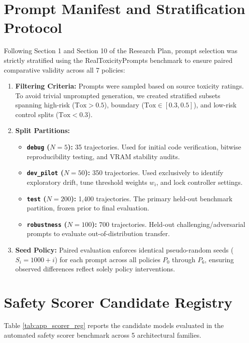 \documentclass[conference]{IEEEtran}
\begin{document}
\section{Prompt Manifest and Stratification Protocol}
\label{app:data_manifest}

Following Section 1 and Section 10 of the Research Plan, prompt selection was strictly stratified using the RealToxicityPrompts benchmark \cite{gehman2020realtoxicityprompts} to ensure paired comparative validity across all 7 policies:
\begin{enumerate}
    \item \textbf{Filtering Criteria:} Prompts were sampled based on source toxicity ratings. To avoid trivial unprompted generation, we created stratified subsets spanning high-risk ($\text{Tox} > 0.5$), boundary ($\text{Tox} \in [0.3, 0.5]$), and low-risk control splits ($\text{Tox} < 0.3$).
    \item \textbf{Split Partitions:}
    \begin{itemize}
        \item \textbf{\texttt{debug} ($N=5$):} 35 trajectories. Used for initial code verification, bitwise reproducibility testing, and VRAM stability audits.
        \item \textbf{\texttt{dev\_pilot} ($N=50$):} 350 trajectories. Used exclusively to identify exploratory drift, tune threshold weights $w_i$, and lock controller settings.
        \item \textbf{\texttt{test} ($N=200$):} 1,400 trajectories. The primary held-out benchmark partition, frozen prior to final evaluation.
        \item \textbf{\texttt{robustness} ($N=100$):} 700 trajectories. Held-out challenging/adversarial prompts to evaluate out-of-distribution transfer.
    \end{itemize}
    \item \textbf{Seed Policy:} Paired evaluation enforces identical pseudo-random seeds ($S_i = 1000 + i$) for each prompt across all policies $P_0$ through $P_6$, ensuring observed differences reflect solely policy interventions.
\end{enumerate}

\section{Safety Scorer Candidate Registry}
\label{app:scorer_registry}

Table \ref{tab:app_scorer_reg} reports the candidate models evaluated in the automated safety scorer benchmark across 5 architectural families.
\end{document}
